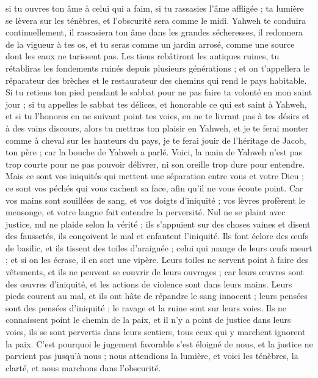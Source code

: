 \begin{multicols}{2}
si tu ouvres ton âme à celui qui a faim, si tu rassasies l'âme affligée ; ta lumière se lèvera sur les ténèbres, et l'obscurité sera comme le midi.
Yahweh te conduira continuellement, il rassasiera ton âme dans les grandes sécheresses, il redonnera de la vigueur à tes os, et tu seras comme un jardin arrosé, comme une source dont les eaux ne tarissent pas.
Les tiens rebâtiront les antiques ruines, tu rétabliras les fondements ruinés depuis plusieurs générations ; et on t'appellera le réparateur des brèches et le restaurateur des chemins qui rend le pays habitable.
Si tu retiens ton pied pendant le sabbat pour ne pas faire ta volonté en mon saint jour ; si tu appelles le sabbat tes délices, et honorable ce qui est saint à Yahweh, et si tu l'honores en ne suivant point tes voies, en ne te livrant pas à tes désirs et à des vains discours,
alors tu mettras ton plaisir en Yahweh, et je te ferai monter comme à cheval sur les hauteurs du pays, je te ferai jouir de l'héritage de Jacob, ton père ; car la bouche de Yahweh a parlé.
\VerseOne{}Voici, la main de Yahweh n'est pas trop courte pour ne pas pouvoir délivrer, ni son oreille trop dure pour entendre.
Mais ce sont vos iniquités qui mettent une séparation entre vous et votre Dieu ; ce sont vos péchés qui vous cachent sa face, afin qu'il ne vous écoute point.
Car vos mains sont souillées de sang, et vos doigts d'iniquité ; vos lèvres profèrent le mensonge, et votre langue fait entendre la perversité.
Nul ne se plaint avec justice, nul ne plaide selon la vérité ; ils s'appuient sur des choses vaines et disent des faussetés, ils conçoivent le mal et enfantent l'iniquité.
Ils font éclore des œufs de basilic, et ils tissent des toiles d'araignée ; celui qui mange de leurs œufs meurt ; et si on les écrase, il en sort une vipère.
Leurs toiles ne servent point à faire des vêtements, et ils ne peuvent se couvrir de leurs ouvrages ; car leurs œuvres sont des œuvres d'iniquité, et les actions de violence sont dans leurs mains.
Leurs pieds courent au mal, et ils ont hâte de répandre le sang innocent ; leurs pensées sont des pensées d'iniquité ; le ravage et la ruine sont sur leurs voies.
Ils ne connaissent point le chemin de la paix, et il n'y a point de justice dans leurs voies, ils se sont pervertis dans leurs sentiers, tous ceux qui y marchent ignorent la paix.
C'est pourquoi le jugement favorable s'est éloigné de nous, et la justice ne parvient pas jusqu'à nous ; nous attendions la lumière, et voici les ténèbres, la clarté, et nous marchons dans l'obscurité.

\end{multicols}
